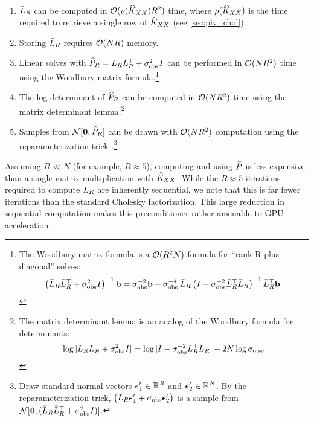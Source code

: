 \begin{observation}
  {\ }
  \begin{enumerate}
    \item $\bar{L}_{R}$ can be computed in $\bigo{\row{\trainK}R^{2}}$ time, where $\rho ( \widehat{K}_{XX} )$ is the time required to retrieve a single row of $\widehat{K}_{XX}$
      (see \cref{sec:piv_chol}).

    \item Storing $\bar{L}_{R}$ requires $\bigo{NR}$ memory.

    \item Linear solves with $\widehat{P}_R = \bar{L}_{R} \bar{L}_{R}^{\top} + \sigma_\text{obs}^{2} I$ can be performed in $\bigo{NR^{2}}$ time using the Woodbury matrix formula.\footnote{
      The Woodbury matrix formula is a $\bigo{R^2 N}$ formula for ``rank-R plus diagonal'' solves:
      $$\left( \bar{L}_{R} \bar{L}_{R}^{\top} + \sigma^{2}_\text{obs} I \right)^{-1} \mathbf{b} = {\sigma_\text{obs}^{-2}}\mathbf{b} - {\sigma_\text{obs}^{-4}} \: \bar{L}_{R} \left( I - {\sigma^{-2}_\text{obs}} \bar{L}_{R}^{\top} \bar{L}_{R} \right)^{-1} \bar{L}_{R}^{\top}\mathbf{b}.$$
    }

    \item The log determinant of $\widehat{P}_R$ can be computed in $\bigo{NR^{2}}$ time using the matrix determinant lemma.\footnote{
      The matrix determinant lemma is an analog of the Woodbury formula for determinants:
      $$\log \vert \bar{L}_{R} \bar{L}_{R}^\top + \sigma^{2}_\text{obs} I \vert = \log \vert I - {\sigma_\text{obs}^{-2}} \bar{L}_{R}^{\top} \bar{L}_{R} \vert + 2 N \log \sigma_\text{obs}.$$
    }

  \item Samples from $\normaldist{ \bzero}{ \trainP_R }$ can be drawn with $\bigo{NR^2}$ computation using the reparameterization trick \cite{kingma2014auto}.\footnote{
      Draw standard normal vectors $\boldsymbol{\epsilon}_1' \in \mathbb{R}^R$ and $\boldsymbol{\epsilon}_2' \in \mathbb{R}^N$.
      By the reparameterization trick, $\left( \bar{L}_R \boldsymbol{\epsilon}_1' + \sigma_\text{obs} \boldsymbol{\epsilon}_2' \right)$ is a sample from $\normaldist{ \bzero}{( \bar\bL_R \bar\bL_R^\top + \sigma^2_\text{obs} \bI )}$.
    }
  \end{enumerate}
\end{observation}
%
\noindent
Assuming $R \ll N$ (for example, $R \approx 5$), computing and using $\widehat{P}$ is less expensive than a single matrix multiplication with $\widehat{K}_{XX}$.
While the $R \approx 5$ iterations required to compute $\bar{L}_R$ are inherently sequential, we note that this is far fewer iterations than the standard Cholesky factorization.
This large reduction in sequential computation makes this preconditioner rather amenable to GPU acceleration.

